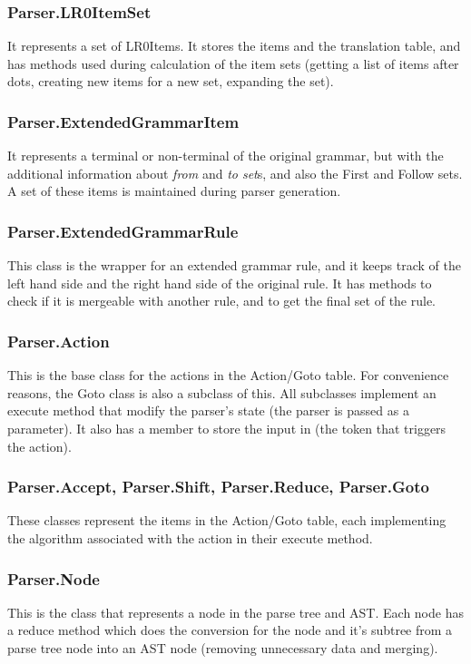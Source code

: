 \subsubsection{Parser.LR0ItemSet}
It represents a set of LR0Items. It stores the items and the translation table, and has methods used during calculation of the item sets (getting a list of items after dots, creating new items for a new set, expanding the set).
\subsubsection{Parser.ExtendedGrammarItem}
It represents a terminal or non-terminal of the original grammar, but with the additional information about \textit{from} and \textit{to set}s, and also the First and Follow sets. A set of these items is maintained during parser generation.
\subsubsection{Parser.ExtendedGrammarRule}
This class is the wrapper for an extended grammar rule, and it keeps track of the left hand side and the right hand side of the original rule. It has methods to check if it is mergeable with another rule, and to get the final set of the rule.
\subsubsection{Parser.Action}
This is the base class for the actions in the Action/Goto table. For convenience reasons, the Goto class is also a subclass of this. All subclasses implement an execute method that modify the parser's state (the parser is passed as a parameter). It also has a member to store the input in (the token that triggers the action).
\subsubsection{Parser.Accept, Parser.Shift, Parser.Reduce, Parser.Goto}
These classes represent the items in the Action/Goto table, each implementing the algorithm associated with the action in their execute method.
\subsubsection{Parser.Node}
This is the class that represents a node in the parse tree and AST. Each node has a reduce method which does the conversion for the node and it's subtree from a parse tree node into an AST node (removing unnecessary data and merging).
